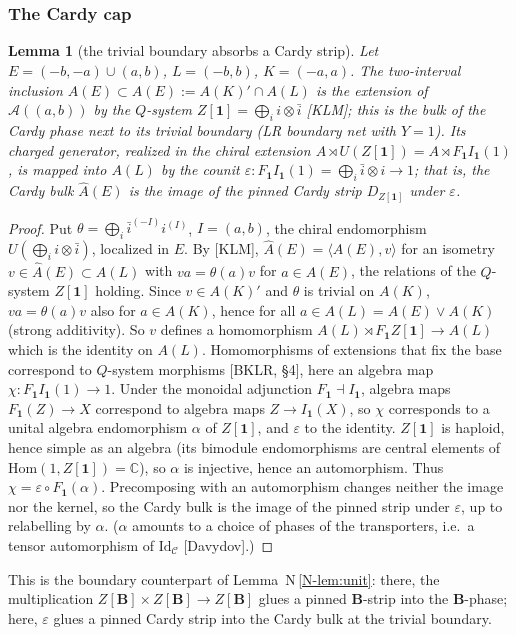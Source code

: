 \documentclass[11pt]{article}
\newtheorem{lemma}[theorem]{Lemma}
\theoremstyle{definition}
\theoremstyle{remark}
\newcommand{\cA}{\mathcal A}
\newcommand{\bfB}{\mathbf B}
\newcommand{\nref}[1]{N\,\ref{N-#1}}
\begin{document}
\subsubsection*{The Cardy cap}
\begin{lemma}[the trivial boundary absorbs a Cardy strip]\label{lem:cardy}
Let $E=(-b,-a)\cup(a,b)$, $L=(-b,b)$, $K=(-a,a)$. The two-interval inclusion $A(E)\subset\hat A(E):=A(K)'\cap A(L)$ is the extension of $\cA((a,b))$ by the $Q$-system $Z[\mathbf 1]=\bigoplus_ii\otimes\bar i$ [KLM]; this is the bulk of the Cardy phase next to its trivial boundary (LR boundary net with $Y=1$). Its charged generator, realized in the chiral extension $A\rtimes U(Z[\mathbf 1])=A\rtimes F_{\mathbf 1}I_{\mathbf 1}(1)$, is mapped into $A(L)$ by the counit $\varepsilon\colon F_{\mathbf 1}I_{\mathbf 1}(1)=\bigoplus_i\bar i\otimes i\to1$; that is, the Cardy bulk $\hat A(E)$ is the image of the pinned Cardy strip $D_{Z[\mathbf 1]}$ under $\varepsilon$.
\end{lemma}
\begin{proof}
Put $\theta=\bigoplus_i\bar i^{(-I)}i^{(I)}$, $I=(a,b)$, the chiral endomorphism $U(\bigoplus_ii\otimes\bar i)$, localized in $E$. By [KLM], $\hat A(E)=\langle A(E),v\rangle$ for an isometry $v\in\hat A(E)\subset A(L)$ with $va=\theta(a)v$ for $a\in A(E)$, the relations of the $Q$-system $Z[\mathbf 1]$ holding. Since $v\in A(K)'$ and $\theta$ is trivial on $A(K)$, $va=\theta(a)v$ also for $a\in A(K)$, hence for all $a\in A(L)=A(E)\vee A(K)$ (strong additivity). So $v$ defines a homomorphism $A(L)\rtimes F_{\mathbf 1}Z[\mathbf 1]\to A(L)$ which is the identity on $A(L)$. Homomorphisms of extensions that fix the base correspond to $Q$-system morphisms [BKLR, \S4], here an algebra map $\chi\colon F_{\mathbf 1}I_{\mathbf 1}(1)\to1$. Under the monoidal adjunction $F_{\mathbf 1}\dashv I_{\mathbf 1}$, algebra maps $F_{\mathbf 1}(Z)\to X$ correspond to algebra maps $Z\to I_{\mathbf 1}(X)$, so $\chi$ corresponds to a unital algebra endomorphism $\alpha$ of $Z[\mathbf 1]$, and $\varepsilon$ to the identity. $Z[\mathbf 1]$ is haploid, hence simple as an algebra (its bimodule endomorphisms are central elements of $\mathrm{Hom}(1,Z[\mathbf 1])=\mathbb C$), so $\alpha$ is injective, hence an automorphism. Thus $\chi=\varepsilon\circ F_{\mathbf 1}(\alpha)$. Precomposing with an automorphism changes neither the image nor the kernel, so the Cardy bulk is the image of the pinned strip under $\varepsilon$, up to relabelling by $\alpha$. ($\alpha$ amounts to a choice of phases of the transporters, i.e.\ a tensor automorphism of $\mathrm{Id}_{\mathcal C}$ [Davydov].)
\end{proof}
This is the boundary counterpart of Lemma~\nref{lem:unit}: there, the multiplication $Z[\bfB]\times Z[\bfB]\to Z[\bfB]$ glues a pinned $\bfB$-strip into the $\bfB$-phase; here, $\varepsilon$ glues a pinned Cardy strip into the Cardy bulk at the trivial boundary.
\end{document}
